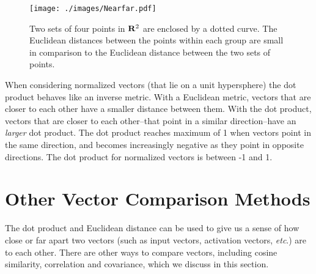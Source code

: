 \begin{figure}[h]
\centering
\texttt{[image: ./images/Nearfar.pdf]}
\caption{Two sets of four points in ${\bf R}^2$ are enclosed by a dotted curve. 
The Euclidean distances between the points within each group are small in 
comparison to the Euclidean distance between the two sets of points.}
\label{nearfar}
\end{figure}

When considering normalized vectors (that lie on a unit hypersphere) the dot product behaves like an inverse metric. With a Euclidean metric, vectors that are closer to each other have a smaller distance between them. With the dot product, vectors that are closer to each other--that point in a similar direction--have an \emph{larger} dot product. The dot product reaches maximum of 1 when vectors point in the same direction, and becomes increasingly negative as they point in opposite directions. The dot product for normalized vectors is between -1 and 1.

\section{Other Vector Comparison Methods}\label{vector_comparisons}

The dot product and Euclidean distance can be used to give us a sense of
how close or far apart two vectors (such as input vectors, activation vectors, 
\emph{etc}.) are to each other. There are other ways to compare vectors, including cosine similarity,
correlation and covariance, which we discuss in this section.

